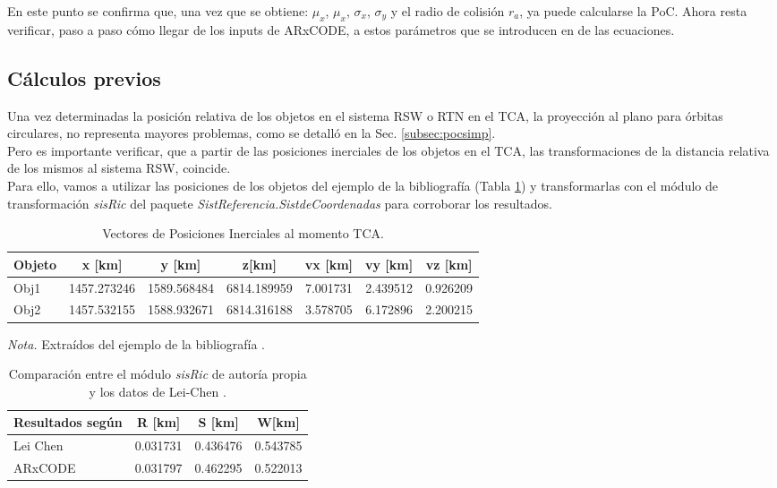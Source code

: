 En este punto se confirma que, una vez que se obtiene: $\mu_{x}$, $\mu_{x}$, $\sigma_{x}$, $\sigma_{y}$ y el radio de colisi\'on $r_{a}$, ya puede calcularse la PoC. 
Ahora resta verificar, paso a paso c\'omo llegar de los inputs de ARxCODE, a estos par\'ametros que se introducen en de las ecuaciones. \\

\subsection*{C\'alculos previos}

Una vez determinadas la posici\'on relativa de los objetos en el sistema RSW o RTN en el TCA, la proyecci\'on al plano para \'orbitas circulares, no representa mayores problemas, como se detall\'o en la Sec. \ref{subsec:pocsimp}.\\

Pero es importante verificar, que a partir de las posiciones inerciales de los objetos en el TCA, las transformaciones de la distancia relativa de los mismos al sistema RSW, coincide.\\
Para ello, vamos a utilizar las posiciones de los objetos del ejemplo de la bibliograf\'ia (Tabla \ref{tab:vectejemplo}) y transformarlas con el m\'odulo de transformaci\'on {\it{sisRic}} del paquete {\it{SistReferencia.SistdeCoordenadas}} para corroborar los resultados.
\\

\begin{table}[!h]
\caption{Vectores de Posiciones Inerciales al momento TCA.}
\begin{tabular}{lcccccc}
\hline
Objeto & x [km] & y [km] &z[km] &vx [km] &vy [km] &vz [km]\\
\hline
Obj1 & 1457.273246 &1589.568484&6814.189959&7.001731&2.439512&0.926209\\
Obj2 & 1457.532155&1588.932671&6814.316188&3.578705&6.172896&2.200215\\
\hline
\end{tabular}
\label{tab:vectejemplo}
\begin{flushleft}
\small {\it{Nota.}} Extra\'idos del ejemplo de la bibliograf\'ia \citep{leichen}.
\end{flushleft}
\end{table}

\begin{table}[!h]
\caption{Comparaci\'on entre el m\'odulo {\it{sisRic}} de autor\'ia propia \\y los datos de Lei-Chen \citep{leichen}.}
\begin{tabular}{lccc}
\hline
Resultados seg\'un & R [km] & S [km] & W[km] \\
\hline
Lei Chen & 0.031731& 0.436476&0.543785\\
ARxCODE & 0.031797& 0.462295 &0.522013
\\
\hline
\end{tabular}
\label{tab:rswcomp}
\end{table}

